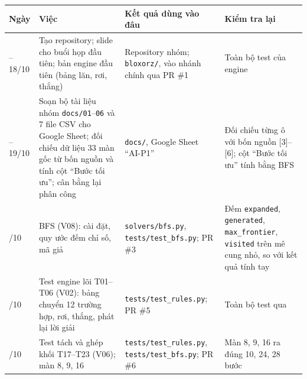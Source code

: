 {\def\LTcaptype{none} %
\begin{longtable}[]{@{}
  >{\raggedright\arraybackslash}p{}
  >{\raggedright\arraybackslash}p{}
  >{\raggedright\arraybackslash}p{}
  >{\raggedright\arraybackslash}p{}@{}}
\toprule\noalign{}
\rowcolor{tablehead}\begin{minipage}[b]{\linewidth}\raggedright
\textbf{Ngày}
\end{minipage} & \begin{minipage}[b]{\linewidth}\raggedright
\textbf{Việc}
\end{minipage} & \begin{minipage}[b]{\linewidth}\raggedright
\textbf{Kết quả dùng vào đâu}
\end{minipage} & \begin{minipage}[b]{\linewidth}\raggedright
\textbf{Kiểm tra lại}
\end{minipage} \\
\midrule\noalign{}
\endhead
\bottomrule\noalign{}
\endlastfoot
15--18/10 & Tạo repository; slide cho buổi họp đầu tiên; bản engine đầu tiên (bảng lăn, rơi, thắng) & Repository nhóm; \texttt{bloxorz/\allowbreak{}}, vào nhánh chính qua PR \#1 & Toàn bộ test của engine \\
\rowrule
18--19/10 & Soạn bộ tài liệu nhóm \texttt{docs/\allowbreak{}01}--\texttt{06} và 7 file CSV cho Google Sheet; đối chiếu dữ liệu 33 màn gốc từ bốn nguồn và tính cột ``Bước tối ưu''; cân bằng lại phân công & \texttt{docs/\allowbreak{}}, Google Sheet ``AI-P1'' & Đối chiếu từng ô với bốn nguồn {[}3{]}--{[}6{]}; cột ``Bước tối ưu'' tính bằng BFS \\
\rowrule
20/10 & BFS (V08): cài đặt, quy ước đếm chỉ số, mã giả & \texttt{solvers/\allowbreak{}bfs.\allowbreak{}py}, \texttt{tests/\allowbreak{}test\_\allowbreak{}bfs.\allowbreak{}py}; PR \#3 & Đếm \texttt{expanded}, \texttt{generated}, \texttt{max\_\allowbreak{}frontier}, \texttt{visited} trên mê cung nhỏ, so với kết quả tính tay \\
\rowrule
21/10 & Test engine lõi T01--T06 (V02): bảng chuyển 12 trường hợp, rơi, thắng, phát lại lời giải & \texttt{tests/\allowbreak{}test\_\allowbreak{}rules.\allowbreak{}py}; PR \#5 & Toàn bộ test qua \\
\rowrule
22/10 & Test tách và ghép khối T17--T23 (V06); màn 8, 9, 16 & \texttt{tests/\allowbreak{}test\_\allowbreak{}rules.\allowbreak{}py}, \texttt{tests/\allowbreak{}test\_\allowbreak{}bfs.\allowbreak{}py}; PR \#6 & Màn 8, 9, 16 ra đúng 10, 24, 28 bước \\

\end{longtable}}
